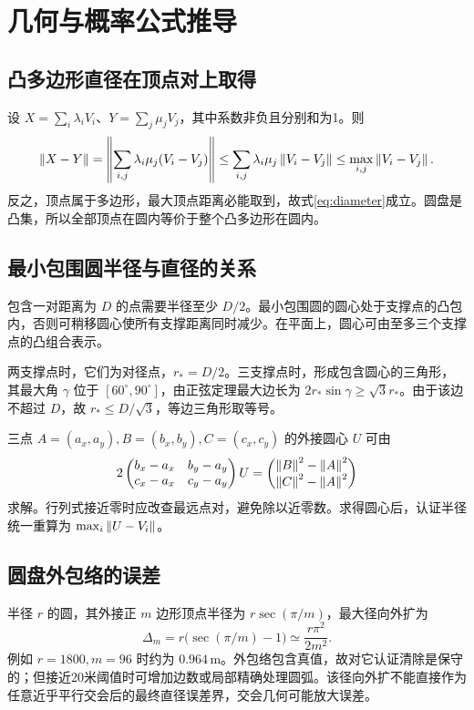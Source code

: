 \section{几何与概率公式推导}
\subsection{凸多边形直径在顶点对上取得}
设 $X=\sum_i\lambda_iV_i$、$Y=\sum_j\mu_jV_j$，其中系数非负且分别和为1。则
\begin{equation}
\left\lVert X-Y\right\rVert=\left\lVert\sum_{i,j}\lambda_i\mu_j(V_i-V_j)\right\rVert
\le\sum_{i,j}\lambda_i\mu_j\left\lVert V_i-V_j\right\rVert
\le\max_{i,j}\left\lVert V_i-V_j\right\rVert.
\end{equation}
反之，顶点属于多边形，最大顶点距离必能取到，故式\eqref{eq:diameter}成立。圆盘是凸集，所以全部顶点在圆内等价于整个凸多边形在圆内。

\subsection{最小包围圆半径与直径的关系}
包含一对距离为 $D$ 的点需要半径至少 $D/2$。最小包围圆的圆心处于支撑点的凸包内，否则可稍移圆心使所有支撑距离同时减少。在平面上，圆心可由至多三个支撑点的凸组合表示。

两支撑点时，它们为对径点，$r_*=D/2$。三支撑点时，形成包含圆心的三角形，其最大角 $\gamma$ 位于 $[60^\circ,90^\circ]$，由正弦定理最大边长为 $2r_*\sin\gamma\ge\sqrt3r_*$。由于该边不超过 $D$，故 $r_*\le D/\sqrt3$，等边三角形取等号。

三点 $A=(a_x,a_y),B=(b_x,b_y),C=(c_x,c_y)$ 的外接圆心 $U$ 可由
\begin{equation}
2\begin{pmatrix}b_x-a_x&b_y-a_y\\c_x-a_x&c_y-a_y\end{pmatrix}U
=\begin{pmatrix}\left\lVert B\right\rVert^2-\left\lVert A\right\rVert^2\\\left\lVert C\right\rVert^2-\left\lVert A\right\rVert^2\end{pmatrix}
\end{equation}
求解。行列式接近零时应改查最远点对，避免除以近零数。求得圆心后，认证半径统一重算为 $\max_i\left\lVert U-V_i\right\rVert$。

\subsection{圆盘外包络的误差}
半径 $r$ 的圆，其外接正 $m$ 边形顶点半径为 $r\sec(\pi/m)$，最大径向外扩为
\begin{equation}
\Delta_m=r\bigl(\sec(\pi/m)-1\bigr)
\simeq\frac{r\pi^2}{2m^2}.
\end{equation}
例如 $r=1800,m=96$ 时约为 $0.964\,\mathrm m$。外包络包含真值，故对它认证清除是保守的；但接近20米阈值时可增加边数或局部精确处理圆弧。该径向外扩不能直接作为任意近乎平行交会后的最终直径误差界，交会几何可能放大误差。

